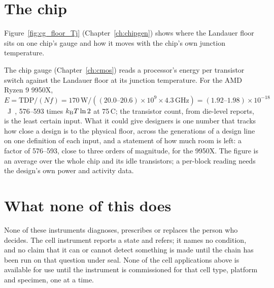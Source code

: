 \section{The chip}
Figure~\ref{fig:cg_floor_Tj} (Chapter~\ref{ch:chipgen}) shows where the Landauer floor sits on one chip's gauge and how it moves with the chip's own
junction temperature.

The chip gauge (Chapter~\ref{ch:cmos}) reads a processor's energy per transistor switch against the Landauer floor at its junction temperature. For
the AMD Ryzen 9 9950X, $E=\mathrm{TDP}/(Nf)=170\,\mathrm W/((20.0\text{--}20.6)\times10^9\times4.3\,\mathrm{GHz})=(1.92\text{--}1.98)\times10^{-18}$~J~\cite{AMD9950X}, 576--593 times
$k_{\mathrm B} T\ln2$ at 75\,\textdegree C; the transistor count, from die-level reports, is the least certain input. \calc{} What it could give designers is one number that tracks how close a design is to the physical floor, across
the generations of a design line on one definition of each input, and a statement of how much room is left: a factor of 576--593, close to three orders of magnitude, for the 9950X. The figure is an average over the whole chip and its idle transistors;
a per-block reading needs the design's own power and activity data. \openprob

\section{What none of this does}

None of these instruments diagnoses, prescribes or replaces the person who decides. The cell instrument reports a state and refers; it names
no condition, and no claim that it can or cannot detect something is made until the chain has been run on that question under seal. None of the
cell applications above is available for use until the instrument is commissioned for that cell type, platform and specimen, one at a time.

